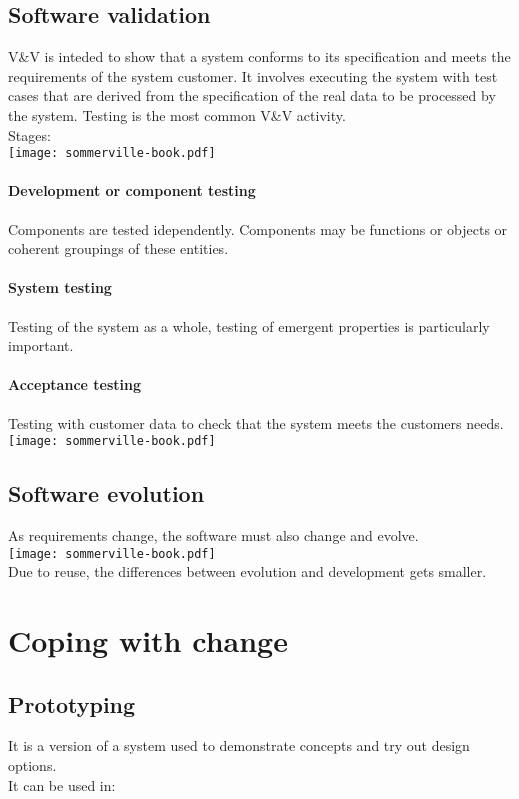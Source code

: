 \documentclass[a4paper,11pt,twocolumn]{report}
\begin{document}
    \subsection{Software validation}
    V\&V is inteded to show that a system conforms to its specification and
    meets the requirements of the system customer. It involves executing the
    system with test cases that are derived from the specification of the real
    data to be processed by the system. Testing is the most common V\&V
    activity.\\
    Stages:\\
    \texttt{[image: sommerville-book.pdf]}\\
    \paragraph{Development or component testing} Components are tested
    idependently. Components may be functions or objects or coherent groupings
    of these entities.
    \paragraph{System testing} Testing of the system as a whole, testing of
    emergent properties is particularly important.
    \paragraph{Acceptance testing} Testing with customer data to check that the
    system meets the customers needs.\\
    \texttt{[image: sommerville-book.pdf]}\\
    \subsection{Software evolution}
    As requirements change, the software must also change and evolve.\\
    \texttt{[image: sommerville-book.pdf]}\\
    Due to reuse, the differences between evolution and development gets
    smaller.
    \section{Coping with change}
    \subsection{Prototyping}
    It is a version of a system used to demonstrate concepts and try out design
    options.\\
    It can be used in:
\end{document}
